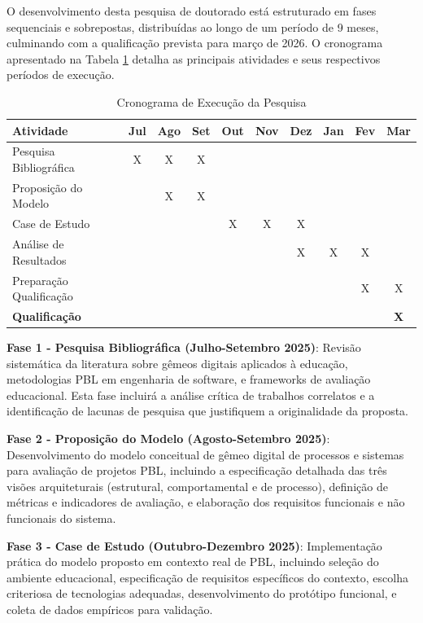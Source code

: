 \documentclass[12pt,a4paper]{article}
\begin{document}
O desenvolvimento desta pesquisa de doutorado está estruturado em fases sequenciais e sobrepostas, distribuídas ao longo de um período de 9 meses, culminando com a qualificação prevista para março de 2026. O cronograma apresentado na Tabela \ref{tab:cronograma} detalha as principais atividades e seus respectivos períodos de execução.

\begin{table}[htbp]
\centering
\caption{Cronograma de Execução da Pesquisa}
\label{tab:cronograma}
\small
\begin{tabular}{|l|c|c|c|c|c|c|c|c|c|}
\hline
\textbf{Atividade} & \textbf{Jul} & \textbf{Ago} & \textbf{Set} & \textbf{Out} & \textbf{Nov} & \textbf{Dez} & \textbf{Jan} & \textbf{Fev} & \textbf{Mar} \\
\hline
Pesquisa Bibliográfica & X & X & X & & & & & & \\
\hline
Proposição do Modelo & & X & X & & & & & & \\
\hline
Case de Estudo & & & & X & X & X & & & \\
\hline
Análise de Resultados & & & & & & X & X & X & \\
\hline
Preparação Qualificação & & & & & & & & X & X \\
\hline
\textbf{Qualificação} & & & & & & & & & \textbf{X} \\
\hline
\end{tabular}
\end{table}

\textbf{Fase 1 - Pesquisa Bibliográfica (Julho-Setembro 2025)}: Revisão sistemática da literatura sobre gêmeos digitais aplicados à educação, metodologias PBL em engenharia de software, e frameworks de avaliação educacional. Esta fase incluirá a análise crítica de trabalhos correlatos e a identificação de lacunas de pesquisa que justifiquem a originalidade da proposta.

\textbf{Fase 2 - Proposição do Modelo (Agosto-Setembro 2025)}: Desenvolvimento do modelo conceitual de gêmeo digital de processos e sistemas para avaliação de projetos PBL, incluindo a especificação detalhada das três visões arquiteturais (estrutural, comportamental e de processo), definição de métricas e indicadores de avaliação, e elaboração dos requisitos funcionais e não funcionais do sistema.

\textbf{Fase 3 - Case de Estudo (Outubro-Dezembro 2025)}: Implementação prática do modelo proposto em contexto real de PBL, incluindo seleção do ambiente educacional, especificação de requisitos específicos do contexto, escolha criteriosa de tecnologias adequadas, desenvolvimento do protótipo funcional, e coleta de dados empíricos para validação.
\end{document}

